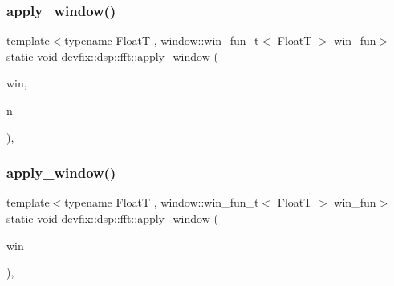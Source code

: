 \subsubsection{\texorpdfstring{apply\+\_\+window()}{apply\_window()}\hspace{0.1cm}{\footnotesize\ttfamily [1/6]}}
{\footnotesize\ttfamily template$<$typename FloatT , window\+::win\+\_\+fun\+\_\+t$<$ Float\+T $>$ win\+\_\+fun$>$ \\
static void devfix\+::dsp\+::fft\+::apply\+\_\+window (\begin{DoxyParamCaption}\item[{std\+::complex$<$ FloatT $>$ $\ast$}]{win,  }\item[{std\+::size\+\_\+t}]{n }\end{DoxyParamCaption})\hspace{0.3cm}{\ttfamily [inline]}, {\ttfamily [static]}}

\mbox{\label{structdevfix_1_1dsp_1_1fft_a0156895b3faa9ae09a28362b8db9c8cf}} 
\subsubsection{\texorpdfstring{apply\+\_\+window()}{apply\_window()}\hspace{0.1cm}{\footnotesize\ttfamily [2/6]}}
{\footnotesize\ttfamily template$<$typename FloatT , window\+::win\+\_\+fun\+\_\+t$<$ Float\+T $>$ win\+\_\+fun$>$ \\
static void devfix\+::dsp\+::fft\+::apply\+\_\+window (\begin{DoxyParamCaption}\item[{std\+::vector$<$ std\+::complex$<$ FloatT $>$$>$ \&}]{win }\end{DoxyParamCaption})\hspace{0.3cm}{\ttfamily [inline]}, {\ttfamily [static]}}

\mbox{\label{structdevfix_1_1dsp_1_1fft_a57f8a79e855a66b88eb3281b6e0797ac}} 
